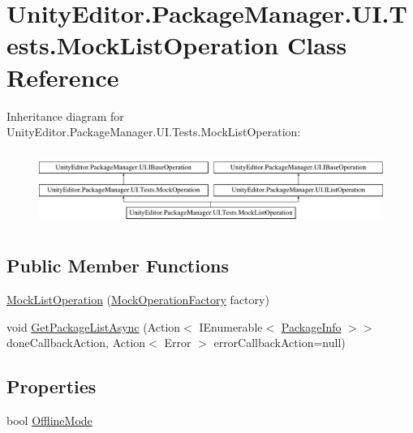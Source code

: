 \hypertarget{class_unity_editor_1_1_package_manager_1_1_u_i_1_1_tests_1_1_mock_list_operation}{}\section{Unity\+Editor.\+Package\+Manager.\+U\+I.\+Tests.\+Mock\+List\+Operation Class Reference}
\label{class_unity_editor_1_1_package_manager_1_1_u_i_1_1_tests_1_1_mock_list_operation}
Inheritance diagram for Unity\+Editor.\+Package\+Manager.\+U\+I.\+Tests.\+Mock\+List\+Operation\+:\begin{figure}[H]
\begin{center}
\leavevmode
\includegraphics[height=2.448980cm]{class_unity_editor_1_1_package_manager_1_1_u_i_1_1_tests_1_1_mock_list_operation}
\end{center}
\end{figure}
\subsection*{Public Member Functions}
\begin{DoxyCompactItemize}
\item 
\mbox{\hyperlink{class_unity_editor_1_1_package_manager_1_1_u_i_1_1_tests_1_1_mock_list_operation_a5289d882cb48663181dbe90adfe496ba}{Mock\+List\+Operation}} (\mbox{\hyperlink{class_unity_editor_1_1_package_manager_1_1_u_i_1_1_tests_1_1_mock_operation_factory}{Mock\+Operation\+Factory}} factory)
\item 
void \mbox{\hyperlink{class_unity_editor_1_1_package_manager_1_1_u_i_1_1_tests_1_1_mock_list_operation_aae7372d4b96be2e32932308ccf3b250b}{Get\+Package\+List\+Async}} (Action$<$ I\+Enumerable$<$ \mbox{\hyperlink{class_unity_editor_1_1_package_manager_1_1_u_i_1_1_package_info}{Package\+Info}} $>$$>$ done\+Callback\+Action, Action$<$ Error $>$ error\+Callback\+Action=null)
\end{DoxyCompactItemize}
\subsection*{Properties}
\begin{DoxyCompactItemize}
\item 
bool \mbox{\hyperlink{class_unity_editor_1_1_package_manager_1_1_u_i_1_1_tests_1_1_mock_list_operation_ab36529b4c9c193f5f9d11a80bd780327}{Offline\+Mode}}
\end{DoxyCompactItemize}
